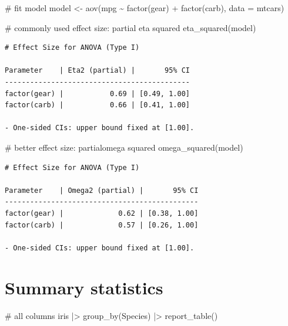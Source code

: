 \documentclass[
  letterpaper,
  DIV=11,
  numbers=noendperiod]{scrreprt}
\newenvironment{Shaded}{\begin{snugshade}}{\end{snugshade}}
\newcommand{\AttributeTok}[1]{\textcolor[rgb]{0.40,0.45,0.13}{#1}}
\newcommand{\CommentTok}[1]{\textcolor[rgb]{0.37,0.37,0.37}{#1}}
\newcommand{\FunctionTok}[1]{\textcolor[rgb]{0.28,0.35,0.67}{#1}}
\newcommand{\NormalTok}[1]{\textcolor[rgb]{0.00,0.23,0.31}{#1}}
\newcommand{\OtherTok}[1]{\textcolor[rgb]{0.00,0.23,0.31}{#1}}
\newcommand{\SpecialCharTok}[1]{\textcolor[rgb]{0.37,0.37,0.37}{#1}}
\begin{document}
\begin{Shaded}
\begin{Highlighting}[]
\CommentTok{\# fit model}
\NormalTok{model }\OtherTok{\textless{}{-}} \FunctionTok{aov}\NormalTok{(mpg }\SpecialCharTok{\textasciitilde{}} \FunctionTok{factor}\NormalTok{(gear) }\SpecialCharTok{+} \FunctionTok{factor}\NormalTok{(carb), }\AttributeTok{data =}\NormalTok{ mtcars)}

\CommentTok{\# commonly used effect size: partial eta squared}
\FunctionTok{eta\_squared}\NormalTok{(model)}
\end{Highlighting}
\end{Shaded}

\begin{verbatim}
# Effect Size for ANOVA (Type I)

Parameter    | Eta2 (partial) |       95% CI
--------------------------------------------
factor(gear) |           0.69 | [0.49, 1.00]
factor(carb) |           0.66 | [0.41, 1.00]

- One-sided CIs: upper bound fixed at [1.00].
\end{verbatim}

\begin{Shaded}
\begin{Highlighting}[]
\CommentTok{\# better effect size: partialomega squared}
\FunctionTok{omega\_squared}\NormalTok{(model)}
\end{Highlighting}
\end{Shaded}

\begin{verbatim}
# Effect Size for ANOVA (Type I)

Parameter    | Omega2 (partial) |       95% CI
----------------------------------------------
factor(gear) |             0.62 | [0.38, 1.00]
factor(carb) |             0.57 | [0.26, 1.00]

- One-sided CIs: upper bound fixed at [1.00].
\end{verbatim}

\section{Summary statistics}\label{summary-statistics}

\begin{Shaded}
\begin{Highlighting}[]
\CommentTok{\# all columns}
\NormalTok{iris }\SpecialCharTok{|\textgreater{}}
  \FunctionTok{group\_by}\NormalTok{(Species) }\SpecialCharTok{|\textgreater{}}
  \FunctionTok{report\_table}\NormalTok{() }
\end{Highlighting}
\end{Shaded}
\end{document}
